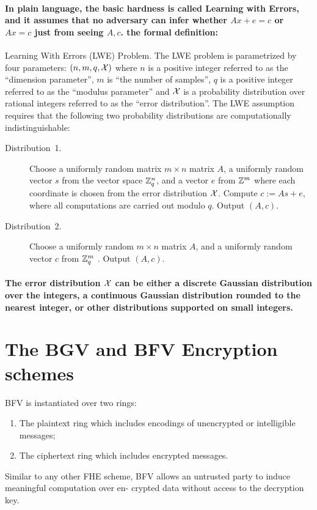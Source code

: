 \paragraph{In plain language, the basic hardness is called Learning with Errors,
and it assumes that no adversary can infer whether $Ax+e=c$ or $Ax=c$
just from seeing $A,c$. the formal definition:}
\begin{defn}
Learning With Errors (LWE) Problem. The LWE problem is parametrized
by four parameters: $\left(n,m,q,\text{\ensuremath{\mathcal{X}}}\right)$
where $n$ is a positive integer referred to as the \textquotedblleft dimension
parameter\textquotedblright , $m$ is \textquotedblleft the number
of samples\textquotedblright , $q$ is a positive integer referred
to as the \textquotedblleft modulus parameter\textquotedblright{}
and $\mathcal{X}$ is a probability distribution over rational integers referred
to as the \textquotedblleft error distribution\textquotedblright .
The LWE assumption requires that the following two probability distributions
are computationally indistinguishable: 
\begin{description}
\item [{Distribution~1.}] Choose a uniformly random matrix $m\times n$
matrix $A$, a uniformly random vector $s$ from the vector space
$\mathbb{Z}_{q}^{n}$, and a vector $e$ from $\mathbb{Z}^{m}$ where each coordinate
is chosen from the error distribution $\mathcal{X}$. Compute $c:=As+e$,
where all computations are carried out modulo $q$. Output $\left(A,c\right)$. 
\item [{Distribution~2.}] Choose a uniformly random $m\times n$ matrix
$A$, and a uniformly random vector $c$ from $\mathbb{Z}_{q}^{m}$ . Output
$\left(A,c\right)$. 
\end{description}

\paragraph{The error distribution $\protect\mathcal{X}$ can be either a discrete Gaussian
distribution over the integers, a continuous Gaussian distribution
rounded to the nearest integer, or other distributions supported on
small integers.}
\end{defn}


\section{The BGV and BFV Encryption schemes}

BFV is instantiated over two rings:
\begin{enumerate}
\item The plaintext ring which includes encodings of unencrypted or intelligible
messages;
\item The ciphertext ring which includes encrypted messages.
\end{enumerate}
Similar to any other FHE scheme, BFV allows an untrusted party to
induce meaningful computation over en- crypted data without access
to the decryption key.

